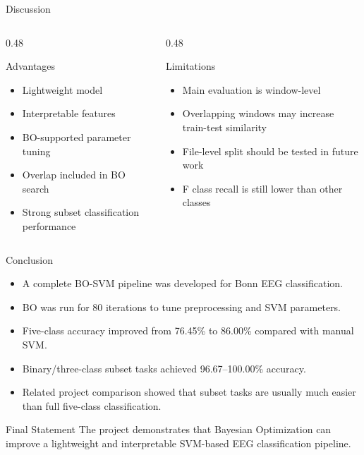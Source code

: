 \documentclass[10pt,aspectratio=169]{beamer}
\begin{document}
\begin{frame}{Discussion}
  \begin{columns}
    \begin{column}{0.48\textwidth}
      \begin{block}{Advantages}
        \begin{itemize}
          \item Lightweight model
          \item Interpretable features
          \item BO-supported parameter tuning
          \item Overlap included in BO search
          \item Strong subset classification performance
        \end{itemize}
      \end{block}
    \end{column}

    \begin{column}{0.48\textwidth}
      \begin{block}{Limitations}
        \begin{itemize}
          \item Main evaluation is window-level
          \item Overlapping windows may increase train-test similarity
          \item File-level split should be tested in future work
          \item F class recall is still lower than other classes
        \end{itemize}
      \end{block}
    \end{column}
  \end{columns}
\end{frame}

\begin{frame}{Conclusion}
  \begin{itemize}
    \item A complete BO-SVM pipeline was developed for Bonn EEG classification.
    \item BO was run for 80 iterations to tune preprocessing and SVM parameters.
    \item Five-class accuracy improved from 76.45\% to 86.00\% compared with manual SVM.
    \item Binary/three-class subset tasks achieved 96.67--100.00\% accuracy.
    \item Related project comparison showed that subset tasks are usually much easier than full five-class classification.
  \end{itemize}

  \begin{block}{Final Statement}
    The project demonstrates that Bayesian Optimization can improve a lightweight and interpretable SVM-based EEG classification pipeline.
  \end{block}
\end{frame}
\end{document}
